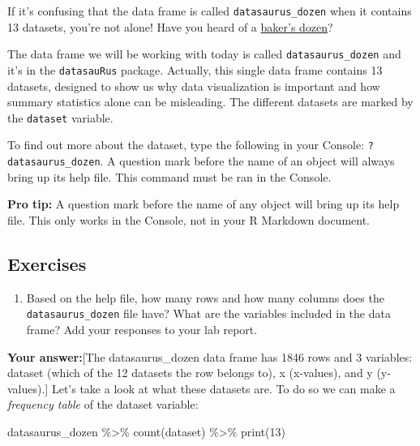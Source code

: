 \documentclass[]{tufte-handout}
\newenvironment{Shaded}{}{}
\newcommand{\DecValTok}[1]{\textcolor[rgb]{0.25,0.63,0.44}{#1}}
\newcommand{\FunctionTok}[1]{\textcolor[rgb]{0.02,0.16,0.49}{#1}}
\newcommand{\NormalTok}[1]{#1}
\newcommand{\SpecialCharTok}[1]{\textcolor[rgb]{0.25,0.44,0.63}{#1}}
\providecommand{\tightlist}{%
  \setlength{\itemsep}{0pt}\setlength{\parskip}{0pt}}
\begin{document}
\begin{marginfigure}
If it's confusing that the data frame is called
\texttt{datasaurus\_dozen} when it contains 13 datasets, you're not
alone! Have you heard of a
\href{https://en.wikipedia.org/wiki/Dozen\#Baker's_dozen}{baker's
dozen}?
\end{marginfigure}

The data frame we will be working with today is called
\texttt{datasaurus\_dozen} and it's in the \texttt{datasauRus} package.
Actually, this single data frame contains 13 datasets, designed to show
us why data visualization is important and how summary statistics alone
can be misleading. The different datasets are marked by the
\texttt{dataset} variable.

To find out more about the dataset, type the following in your Console:
\texttt{?datasaurus\_dozen}. A question mark before the name of an
object will always bring up its help file. This command must be ran in
the Console.

\textbf{Pro tip:} A question mark before the name of any object will
bring up its help file. This only works in the Console, not in your R
Markdown document.

\subsection{Exercises}\label{exercises}

\begin{enumerate}
\def\labelenumi{\arabic{enumi}.}
\tightlist
\item
  Based on the help file, how many rows and how many columns does the
  \texttt{datasaurus\_dozen} file have? What are the variables included
  in the data frame? Add your responses to your lab report.
\end{enumerate}

\textbf{Your answer:}{[}The datasaurus\_dozen data frame has 1846 rows
and 3 variables: dataset (which of the 12 datasets the row belongs to),
x (x-values), and y (y-values).{]} Let's take a look at what these
datasets are. To do so we can make a \emph{frequency table} of the
dataset variable:

\begin{Shaded}
\begin{Highlighting}[]
\NormalTok{datasaurus\_dozen }\SpecialCharTok{\%\textgreater{}\%}
  \FunctionTok{count}\NormalTok{(dataset) }\SpecialCharTok{\%\textgreater{}\%}
  \FunctionTok{print}\NormalTok{(}\DecValTok{13}\NormalTok{)}
\end{Highlighting}
\end{Shaded}
\end{document}
